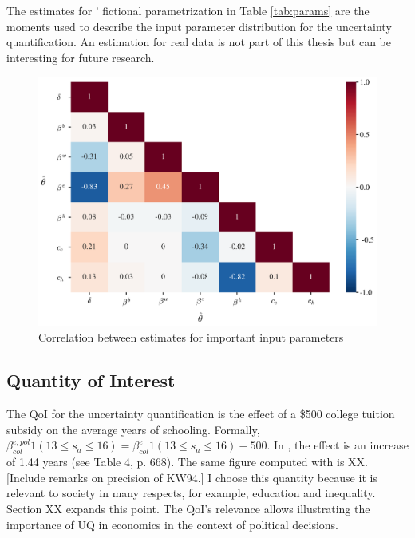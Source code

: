 The estimates for \citeauthor{Keane.1994}' fictional parametrization in Table \ref{tab:params} are the moments used to describe the input parameter distribution for the uncertainty quantification. An estimation for real data is not part of this thesis but can be interesting for future research.

\begin{figure}[H]
	\caption{Correlation between estimates for important input parameters}
	\centering
	\includegraphics[scale=0.45]{../figures/heatmap_corr_chol}
\end{figure}

\subsection{Quantity of Interest}

The QoI for the uncertainty quantification is the effect of a \$500 college tuition subsidy on the average years of schooling. Formally, $\beta_{col}^{e,pol} 1(13 \leq s_a \leq 16) = \beta_{col}^e 1(13 \leq s_a \leq 16) - 500$. In \cite{Keane.1994}, the effect is an increase of 1.44 years (see Table 4, p. 668). The same figure computed with  is XX. [Include remarks on precision of KW94.] I choose this quantity because it is relevant to society in many respects, for example, education and inequality. Section XX expands this point. The QoI's relevance allows illustrating the importance of UQ in economics in the context of political decisions.

